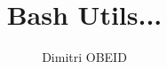 \documentclass[a4paper,10pt]{article}
\title{\color{red}Bash Utils...}\color{text}
\author{Dimitri OBEID}
\begin{document}
    \maketitle
    \newpage

    \hypertarget{contents}{}
    \tableofcontents
    \newpage




\end{document}

